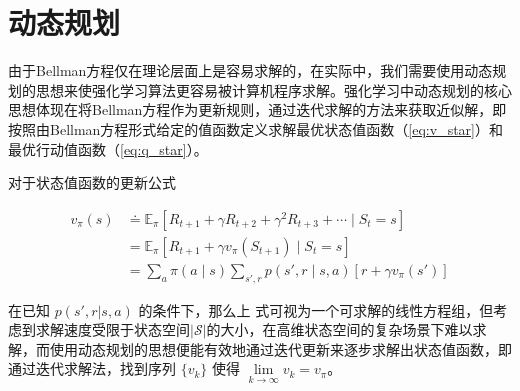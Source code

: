 


\section{动态规划}

由于Bellman方程仅在理论层面上是容易求解的，在实际中，我们需要使用动态规划的思想来使强化学习算法更容易被计算机程序求解。强化学习中动态规划的核心思想体现在将Bellman方程作为更新规则，通过迭代求解的方法来获取近似解，即按照由Bellman方程形式给定的值函数定义求解最优状态值函数（\ref{eq:v_star}）和最优行动值函数（\ref{eq:q_star}）。

对于状态值函数的更新公式

\begin{equation}
\begin{aligned}
v_\pi(s) &\doteq \mathbb{E}_\pi[R_{t+1}+\gamma R_{t+2}+ \gamma^2 R_{t+3}+ \cdots \mid S_t = s] \\ 
&= \mathbb{E}_\pi[R_{t+1}+\gamma v_\pi(S_{t+1}) \mid S_t=s]\\ 
&=\sum_a\pi(a\mid s)\sum_{s',r}p(s',r\mid s,a)[r+\gamma v_\pi(s')]
\end{aligned}
\end{equation}

在已知 $p(s',r|s,a)$ 的条件下，那么上 式可视为一个可求解的线性方程组，但考虑到求解速度受限于状态空间$|\mathcal{S}|$的大小，在高维状态空间的复杂场景下难以求解，而使用动态规划的思想便能有效地通过迭代更新来逐步求解出状态值函数，即通过迭代求解法，找到序列 $\{v_k\}$ 使得 $\lim\limits_{k\to\infty}v_k=v_\pi$。


